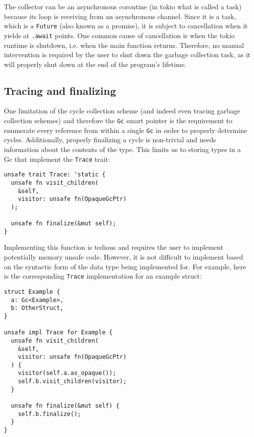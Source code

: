 \documentclass[sigplan,review,anonymous]{acmart}
\begin{document}
The collector can be an asynchronous coroutine (in tokio what is called a task)
because its loop is receiving from an asynchronous channel. Since it is a task,
which is a \texttt{Future} (also known as a promise), it is subject to
cancellation\cite{cancellation} when it yields at \texttt{.await} points.
One common cause of cancellation is when the tokio runtime is shutdown,
i.e. when the main function returns. Therefore, no manual intervention is
required by the user to shut down the garbage collection task, as it will
properly shut down at the end of the program's lifetime.

\subsection{Tracing and finalizing}

One limitation of the cycle collection scheme (and indeed even tracing garbage
collection schemes) and therefore the \texttt{Gc} smart pointer is the
requirement to enumerate every reference from within a single \texttt{Gc} in
order to properly determine cycles. Additionally, properly finalizing a cycle is
non-trivial and needs information about the contents of the type. This limits us
to storing types in a Gc that implement the \texttt{Trace} trait:

\begin{verbatim}
unsafe trait Trace: 'static {
  unsafe fn visit_children(
    &self,
    visitor: unsafe fn(OpaqueGcPtr)
  );

  unsafe fn finalize(&mut self);
}
\end{verbatim}

Implementing this function is tedious and requires the user to implement
potentially memory unsafe code. However, it is not difficult to implement based
on the syntactic form of the data type being implemented for. For example, here
is the corresponding \texttt{Trace} implementation for an example struct:

\begin{verbatim}
struct Example {
  a: Gc<Example>,
  b: OtherStruct,
}

unsafe impl Trace for Example {
  unsafe fn visit_children(
    &self,
    visitor: unsafe fn(OpaqueGcPtr)
  ) {
    visitor(self.a.as_opaque());
    self.b.visit_children(visitor);
  }

  unsafe fn finalize(&mut self) {
    self.b.finalize();
  }
}
\end{verbatim}
\end{document}

